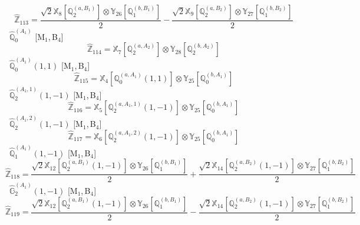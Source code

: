 \documentclass[fleqn,10pt,landscape]{article}
\begin{document}
\begin{itemize}
\begin{dmath*}
\hat{\mathbb{Z}}_{113}=\frac{\sqrt{2} \mathbb{X}_{8}[\mathbb{Q}_{2}^{(a,B_{1})}] \otimes\mathbb{Y}_{26}[\mathbb{Q}_{1}^{(b,B_{1})}]}{2} - \frac{\sqrt{2} \mathbb{X}_{9}[\mathbb{Q}_{2}^{(a,B_{2})}] \otimes\mathbb{Y}_{27}[\mathbb{Q}_{1}^{(b,B_{2})}]}{2}
\end{dmath*}
\vspace{4mm}
\noindent {} $\,\,\,\hat{\mathbb{Q}}_{0}^{(A_{1})}$ [M$_{1}$,\,B$_{4}$]
\begin{dmath*}
\hat{\mathbb{Z}}_{114}=\mathbb{X}_{7}[\mathbb{Q}_{2}^{(a,A_{2})}] \otimes\mathbb{Y}_{28}[\mathbb{Q}_{2}^{(b,A_{2})}]
\end{dmath*}
\vspace{4mm}
\noindent {} $\,\,\,\hat{\mathbb{Q}}_{0}^{(A_{1})}(1,1)$ [M$_{1}$,\,B$_{4}$]
\begin{dmath*}
\hat{\mathbb{Z}}_{115}=\mathbb{X}_{4}[\mathbb{Q}_{0}^{(a,A_{1})}(1,1)] \otimes\mathbb{Y}_{25}[\mathbb{Q}_{0}^{(b,A_{1})}]
\end{dmath*}
\vspace{4mm}
\noindent {} $\,\,\,\hat{\mathbb{Q}}_{2}^{(A_{1},1)}(1,-1)$ [M$_{1}$,\,B$_{4}$]
\begin{dmath*}
\hat{\mathbb{Z}}_{116}=\mathbb{X}_{5}[\mathbb{Q}_{2}^{(a,A_{1},1)}(1,-1)] \otimes\mathbb{Y}_{25}[\mathbb{Q}_{0}^{(b,A_{1})}]
\end{dmath*}
\vspace{4mm}
\noindent {} $\,\,\,\hat{\mathbb{Q}}_{2}^{(A_{1},2)}(1,-1)$ [M$_{1}$,\,B$_{4}$]
\begin{dmath*}
\hat{\mathbb{Z}}_{117}=\mathbb{X}_{6}[\mathbb{Q}_{2}^{(a,A_{1},2)}(1,-1)] \otimes\mathbb{Y}_{25}[\mathbb{Q}_{0}^{(b,A_{1})}]
\end{dmath*}
\vspace{4mm}
\noindent {} $\,\,\,\hat{\mathbb{Q}}_{1}^{(A_{1})}(1,-1)$ [M$_{1}$,\,B$_{4}$]
\begin{dmath*}
\hat{\mathbb{Z}}_{118}=\frac{\sqrt{2} \mathbb{X}_{12}[\mathbb{Q}_{2}^{(a,B_{1})}(1,-1)] \otimes\mathbb{Y}_{26}[\mathbb{Q}_{1}^{(b,B_{1})}]}{2} + \frac{\sqrt{2} \mathbb{X}_{14}[\mathbb{Q}_{2}^{(a,B_{2})}(1,-1)] \otimes\mathbb{Y}_{27}[\mathbb{Q}_{1}^{(b,B_{2})}]}{2}
\end{dmath*}
\vspace{4mm}
\noindent {} $\,\,\,\hat{\mathbb{G}}_{2}^{(A_{1})}(1,-1)$ [M$_{1}$,\,B$_{4}$]
\begin{dmath*}
\hat{\mathbb{Z}}_{119}=\frac{\sqrt{2} \mathbb{X}_{12}[\mathbb{Q}_{2}^{(a,B_{1})}(1,-1)] \otimes\mathbb{Y}_{26}[\mathbb{Q}_{1}^{(b,B_{1})}]}{2} - \frac{\sqrt{2} \mathbb{X}_{14}[\mathbb{Q}_{2}^{(a,B_{2})}(1,-1)] \otimes\mathbb{Y}_{27}[\mathbb{Q}_{1}^{(b,B_{2})}]}{2}

\end{dmath*}
\end{itemize}
\end{document}
